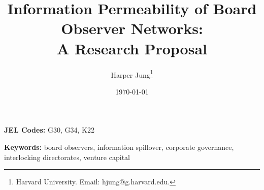 \documentclass[12pt]{article}
\title{Information Permeability of Board Observer Networks:\\A Research Proposal}
\author{
Harper Jung\thanks{Harvard University. Email: hjung@g.harvard.edu.}
}
\date{\today}
\begin{document}
\maketitle
\thispagestyle{empty}

\begin{abstract}
\noindent \singlespacing

\end{abstract}

\vspace{1em}
\noindent \textbf{JEL Codes:} G30, G34, K22

\vspace{0.5em}
\noindent \textbf{Keywords:} board observers, information spillover, corporate governance, interlocking directorates, venture capital

\newpage
\setcounter{page}{1}







\newpage
\singlespacing



\newpage
\appendix

\end{document}
